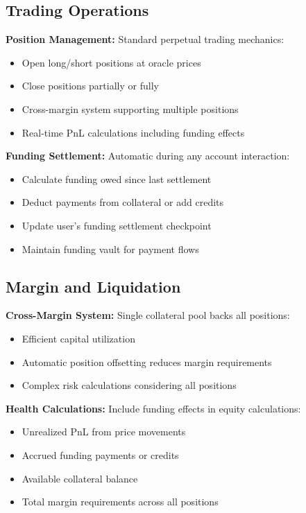 \documentclass[12pt]{article}
\begin{document}
\begin{itemize}
\subsection{Trading Operations}

\textbf{Position Management:} Standard perpetual trading mechanics:
\begin{itemize}
    \item Open long/short positions at oracle prices
    \item Close positions partially or fully
    \item Cross-margin system supporting multiple positions
    \item Real-time PnL calculations including funding effects
\end{itemize}

\textbf{Funding Settlement:} Automatic during any account interaction:
\begin{itemize}
    \item Calculate funding owed since last settlement
    \item Deduct payments from collateral or add credits
    \item Update user's funding settlement checkpoint
    \item Maintain funding vault for payment flows
\end{itemize}

\subsection{Margin and Liquidation}

\textbf{Cross-Margin System:} Single collateral pool backs all positions:
\begin{itemize}
    \item Efficient capital utilization
    \item Automatic position offsetting reduces margin requirements
    \item Complex risk calculations considering all positions
\end{itemize}

\textbf{Health Calculations:} Include funding effects in equity calculations:
\begin{itemize}
    \item Unrealized PnL from price movements
    \item Accrued funding payments or credits
    \item Available collateral balance
    \item Total margin requirements across all positions
\end{itemize}


\end{itemize}
\end{document}
